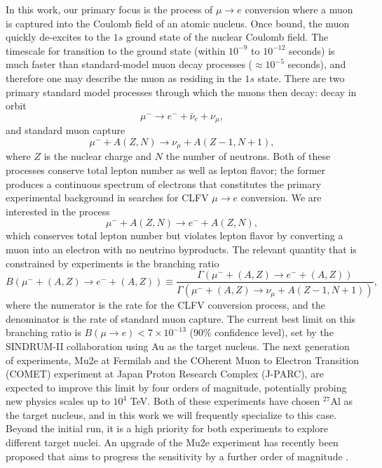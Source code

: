 \documentclass{book}[letterpaper,12pt]
\begin{document}
In this work, our primary focus is the process of $\mu\rightarrow e$ conversion where a muon is captured into the Coulomb field of an atomic nucleus. 
Once bound, the muon quickly de-excites to the $1s$ ground state of the nuclear Coulomb field. The timescale for transition to the ground state (within $10^{-9}$ to $10^{-12}$ seconds) is much faster than standard-model muon decay processes ($\approx 10^{-5}$ seconds), and therefore one may describe the muon as residing in the $1s$ state. There are two primary standard model processes through which the muons then decay: decay in orbit
\begin{equation}
\mu^-\rightarrow e^- + \bar{\nu}_e+\nu_{\mu},
\end{equation}
and standard muon capture
\begin{equation}
\mu^- + A(Z,N)\rightarrow \nu_{\mu}+A(Z-1,N+1),
\end{equation}
where $Z$ is the nuclear charge and $N$ the number of neutrons. Both of these processes conserve total lepton number as well as lepton flavor; the former produces a continuous spectrum of electrons that constitutes the primary experimental background in searches for CLFV $\mu\rightarrow e$ conversion. We are interested in the process
\begin{equation}
\mu^-+A(Z,N)\rightarrow e^- + A(Z,N),
\end{equation}
which conserves total lepton number but violates lepton flavor  by converting a muon into an electron with no neutrino byproducts. The relevant quantity that is constrained by experiments is the branching ratio
\begin{equation}
B(\mu^-+(A,Z)\rightarrow e^- + (A,Z))\equiv\frac{\Gamma(\mu^-+(A,Z)\rightarrow e^-+(A,Z))}{\Gamma(\mu^-+(A,Z)\rightarrow\nu_{\mu}+A(Z-1,N+1))},
\end{equation}
where the numerator is the rate for the CLFV conversion process, and the denominator is the rate of standard muon capture. The current best limit on this branching ratio is $B(\mu\rightarrow e)<7\times 10^{-13}$ (90\% confidence level), set by the SINDRUM-II collaboration \citep{Bertl2006} using Au as the target nucleus. The next generation of experiments, Mu2e at Fermilab \citep{Bernstein_2019} and the COherent Muon to Electron Transition (COMET) experiment \citep{10.3389/fphy.2018.00133} at Japan Proton Research Complex (J-PARC), are expected to improve this limit by four orders of magnitude, potentially probing new physics scales up to $10^4$ TeV. Both of these experiments have chosen $^{27}$Al as the target nucleus, and in this work we will frequently specialize to this case. Beyond the initial run, it is a high priority for both experiments to explore different target nuclei. An upgrade of the Mu2e experiment has recently been proposed that aims to progress the sensitivity by a further order of magnitude \cite{Mu2e:2018osu}.
\end{document}

